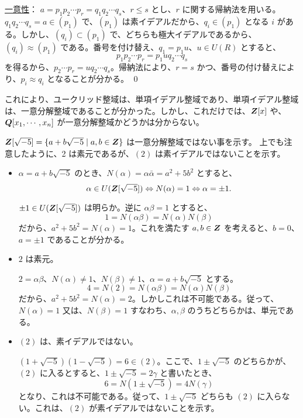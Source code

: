 \underline{一意性}：
$a = p_1p_2\cdots p_r = q_1q_2\cdots q_s$、$r\leq s$ とし、$r$ に関する帰納法を用いる。$q_1q_2 \cdots q_s = a\in (p_1)$ で、$(p_1)$ は素イデアルだから、$q_i\in (p_1)$ となる $i$ がある。しかし、$(q_i)\subset (p_1)$ で、どちらも極大イデアルであるから、$(q_i)\approx (p_1)$ である。番号を付け替え、$q_1 = p_1u$、$u\in U(R)$ とすると、
$$p_1p_2\cdots p_r = p_1uq_2\cdots q_s$$
を得るから、$p_2\cdots p_r = uq_2\cdots q_s$。帰納法により、$r = s$ かつ、番号の付け替えにより、$p_i\approx q_i$ となることが分かる。
\qed

\medskip
これにより、ユークリッド整域は、単項イデアル整域であり、単項イデアル整域は、一意分解整域であることが分かった。しかし、これだけでは、$\mbox{\boldmath $Z$}[x]$ や、$\mbox{\boldmath $Q$}[x_1,\cdots, x_n]$ が一意分解整域かどうかは分からない。

\begin{eg}
$\mbox{\boldmath $Z$}[\sqrt{-5}] = \{a + b\sqrt{-5}\mid a,b\in \mbox{\boldmath $Z$}\}$ は一意分解整域ではない事を示す。
上でも注意したように、2  は素元であるが、$(2)$ は素イデアルではないことを示す。
\begin{itemize}
\item $\alpha = a +b\sqrt{-5}$ のとき、$N(\alpha) = \alpha\bar{\alpha} = a^2 + 5b^2$ とすると、
$$\alpha\in U(\mbox{\boldmath $Z$}[\sqrt{-5}]) \Leftrightarrow N(\alpha) = 1 \Leftrightarrow \alpha = \pm 1.$$

\pf 
$\pm 1\in U(\mbox{\boldmath $Z$}[\sqrt{-5}])$ は明らか。逆に $\alpha\beta = 1$ とすると、
$$1 = N(\alpha\beta) = N(\alpha)N(\beta)$$
だから、$a^2 + 5b^2 = N(\alpha) = 1$。これを満たす $a,b\in \mbox{\boldmath $Z$}$ を考えると、$b = 0$、$a = \pm 1$ であることが分かる。
\item $2$ は素元。

\pf 
$2 = \alpha\beta$、$N(\alpha)\neq 1$、$N(\beta)\neq 1$、$\alpha = a + b\sqrt{-5}$ とする。
$$4 = N(2) = N(\alpha\beta) = N(\alpha)N(\beta)$$
だから、$a^2 + 5b^2 = N(\alpha) = 2$。しかしこれは不可能である。従って、$N(\alpha) = 1$ 又は、$N(\beta) = 1$ すなわち、$\alpha, \beta$ のうちどちらかは、単元である。
\item $(2)$ は、素イデアルではない。

\pf
$(1+\sqrt{-5})(1-\sqrt{-5}) = 6 \in (2)$。ここで、$1\pm\sqrt{-5}$ のどちらかが、$(2)$ に入るとすると、$1\pm \sqrt{-5} = 2\gamma$ と書いたとき、
$$6 = N(1\pm\sqrt{-5}) = 4N(\gamma)$$
となり、これは不可能である。従って、$1\pm\sqrt{-5}$ どちらも $(2)$ に入らない。これは、$(2)$ が素イデアルではないことを示す。
\end{itemize}
\end{eg}

\newpage
